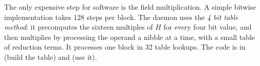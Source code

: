 The only expensive step for software is the field multiplication. A simple bitwise implementation takes 128 steps per block. The daemon uses the \emph{4 bit table method}: it precomputes the sixteen multiples of $H$ for every four bit value, and then multiplies by processing the operand a nibble at a time, with a small table of reduction terms. It processes one block in 32 table lookups. The code is in  (build the table) and  (use it).
